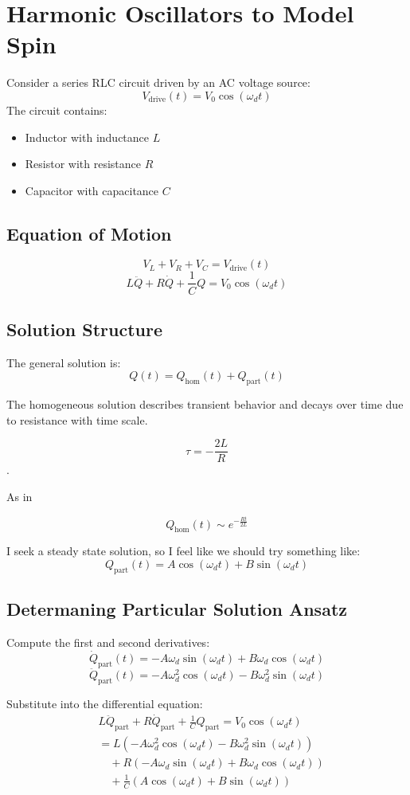 \documentclass{article}
\begin{document}
\section{Harmonic Oscillators to Model Spin}

Consider a series RLC circuit driven by an AC voltage source:
\[
V_{\text{drive}}(t) = V_0 \cos(\omega_d t)
\]
The circuit contains:
\begin{itemize}
  \item Inductor with inductance $L$
  \item Resistor with resistance $R$
  \item Capacitor with capacitance $C$
\end{itemize}

\subsection{Equation of Motion}
\[
V_L + V_R + V_C = V_{\text{drive}}(t)
\]
\[
\boxed{L \ddot{Q} + R \dot{Q} + \frac{1}{C} Q = V_0 \cos(\omega_d t)}
\]

\subsection{Solution Structure}

The general solution is:
\[
Q(t) = Q_{\text{hom}}(t) + Q_{\text{part}}(t)
\]

The homogeneous solution describes transient behavior and decays over time due to resistance with time scale.

\[\tau = -\frac{2L}{R}\].

As in 

\[Q_{\text{hom}}(t) \sim e^{-\frac{Rt}{2L}}\]

I seek a steady state solution, so I feel like we should try something like:
\[
Q_{\text{part}}(t) = A \cos(\omega_d t) + B \sin(\omega_d t)
\]

\subsection{Determaning Particular Solution Ansatz}
Compute the first and second derivatives:
\[
\dot{Q}_{\text{part}}(t) = -A \omega_d \sin(\omega_d t) + B \omega_d \cos(\omega_d t)
\]
\[
\ddot{Q}_{\text{part}}(t) = -A \omega_d^2 \cos(\omega_d t) - B \omega_d^2 \sin(\omega_d t)
\]

Substitute into the differential equation:
\begin{align*}
&L \ddot{Q}_{\text{part}} + R \dot{Q}_{\text{part}} + \frac{1}{C} Q_{\text{part}} = V_0 \cos(\omega_d t) \\
&= L(-A \omega_d^2 \cos(\omega_d t) - B \omega_d^2 \sin(\omega_d t)) \\
&\quad + R(-A \omega_d \sin(\omega_d t) + B \omega_d \cos(\omega_d t)) \\
&\quad + \frac{1}{C}(A \cos(\omega_d t) + B \sin(\omega_d t))
\end{align*}
\end{document}
